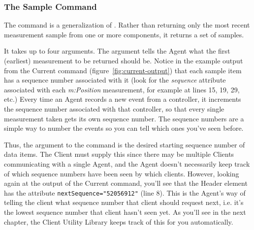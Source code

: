\begin{quotation}
\end{quotation}


\subsubsection{The Sample Command}
\label{sec:cmd:sample}

The command  is a generalization of .
Rather than returning only the most recent measurement sample from one
or more components, it returns a set of samples.

It takes up to four arguments. 
The  argument tells the Agent what the first (earliest)
measurement to be returned should be.  Notice in the example output from
the Current command (figure~\ref{fig:current-output}) that each sample
item has a sequence number associated with it (look for the
\emph{sequence} attribute associated with each \emph{m:Position}
measurement, for example at lines 15, 19, 29, etc.)  
Every time an Agent records a new event from a controller, it
increments the sequence number associated with that controller, so that
every single measurement taken gets its own sequence number.  The
sequence numbers are a simple way to number the events so you can tell
which ones you've seen before.  

Thus, the  argument to the  command is the
desired starting sequence number of data items.  The Client must supply
this since there may be multiple Clients communicating with a single
Agent, and the Agent doesn't necessarily keep track of which sequence
numbers have been seen by which clients.  However, looking again at the
output of the Current command, you'll see that the Header element has
the attribute \texttt{nextSequence="52056912"} (line 8).  This is the
Agent's way of telling the client what sequence number that client
should request next, i.e. it's the lowest sequence number that client
hasn't seen yet.  As you'll see in the next chapter, the Client Utility
Library keeps track of this for you automatically.


